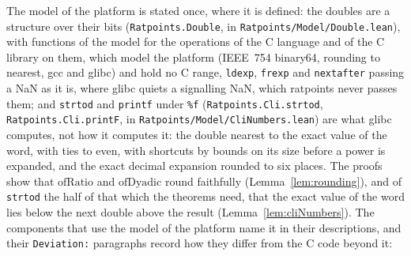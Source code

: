 The model of the platform is stated once, where it is defined: the doubles are a structure over
their bits (\verb|Ratpoints.Double|, in \verb|Ratpoints/Model/Double.lean|), with functions of the
model for the operations of the C language and of the C library on them, which model the platform
(IEEE~754 binary64, rounding to nearest, gcc and glibc) and hold no C range, \verb|ldexp|,
\verb|frexp| and \verb|nextafter| passing a NaN as it is, where glibc quiets a signalling NaN, which
ratpoints never passes them; and \verb|strtod| and \verb|printf| under \verb|%f|
(\verb|Ratpoints.Cli.strtod|, \verb|Ratpoints.Cli.printF|, in
\verb|Ratpoints/Model/CliNumbers.lean|) are what glibc computes, not how it computes it: the double
nearest to the exact value of the word, with ties to even, with shortcuts by bounds on its size
before a power is expanded, and the exact decimal expansion rounded to six places. The proofs show
that $\mathrm{ofRatio}$ and $\mathrm{ofDyadic}$ round faithfully (Lemma~\ref{lem:rounding}), and of
\verb|strtod| the half of that which the theorems need, that the exact value of the word lies below
the next double above the result (Lemma~\ref{lem:cliNumbers}). The components that use the model of
the platform name it in their descriptions, and their \verb|Deviation:| paragraphs record how they
differ from the C code beyond it:
